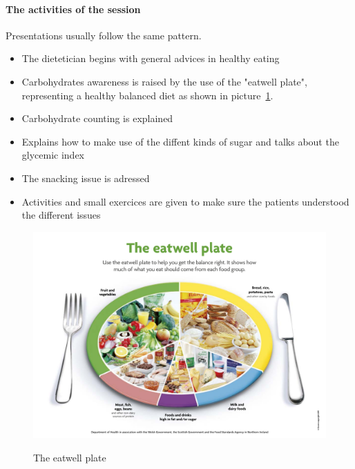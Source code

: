 \paragraph{The activities of the session}
Presentations usually follow the same pattern. 
\begin{itemize}
\item The dietetician begins with general advices in healthy eating
\item Carbohydrates awareness is raised by the use of the "eatwell plate", representing a healthy balanced diet as shown in picture~\ref{fig:eat_wp}.
\item Carbohydrate counting is explained
\item Explains how to make use of the diffent kinds of sugar %
and talks about the glycemic index
\item The snacking issue is adressed
\item Activities and small exercices are given to make sure the patients understood the different issues
\end{itemize}
 
 
\begin{figure}
  \caption{The eatwell plate}
  \centering
  \includegraphics[scale=0.43]{theeatwellplate.pdf}
  \label{fig:eat_wp}
\end{figure}



